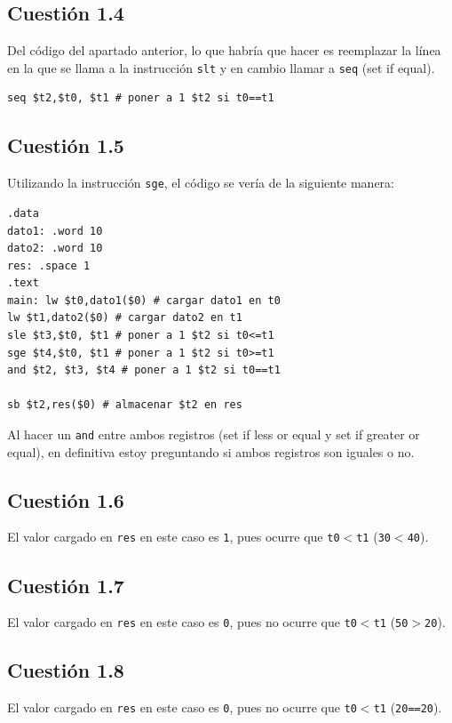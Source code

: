 \documentclass[11pt]{article}
\begin{document}
\begin{large}
\begin{flushleft}
\subsection*{Cuestión 1.4}
Del código del apartado anterior, lo que habría que hacer es reemplazar la línea en la que se llama a la instrucción \texttt{slt} y en cambio llamar a \texttt{seq} (set if equal).

\begin{listing}[h]
\begin{verbatim}
seq $t2,$t0, $t1 # poner a 1 $t2 si t0==t1
\end{verbatim}
\end{listing}

\subsection*{Cuestión 1.5}
Utilizando la instrucción \texttt{sge}, el código se vería de la siguiente manera:
\begin{listing}[h]
\begin{verbatim}
.data
dato1: .word 10
dato2: .word 10
res: .space 1
.text
main: lw $t0,dato1($0) # cargar dato1 en t0
lw $t1,dato2($0) # cargar dato2 en t1
sle $t3,$t0, $t1 # poner a 1 $t2 si t0<=t1
sge $t4,$t0, $t1 # poner a 1 $t2 si t0>=t1
and $t2, $t3, $t4 # poner a 1 $t2 si t0==t1

sb $t2,res($0) # almacenar $t2 en res
\end{verbatim}
\end{listing}

Al hacer un \texttt{and} entre ambos registros (set if less or equal y set if greater or equal), en definitiva estoy preguntando si ambos registros son iguales o no.


\subsection*{Cuestión 1.6}

El valor cargado en \texttt{res} en este caso es \texttt{1}, pues ocurre que \texttt{t0$<$t1} (\texttt{30$<$40}).


\subsection*{Cuestión 1.7}
El valor cargado en \texttt{res} en este caso es \texttt{0}, pues no ocurre que \texttt{t0$<$t1} (\texttt{50$>$20}).

\subsection*{Cuestión 1.8}
El valor cargado en \texttt{res} en este caso es \texttt{0}, pues no ocurre que \texttt{t0$<$t1} (\texttt{20==20}).


\end{flushleft}
\end{large}
\end{document}
